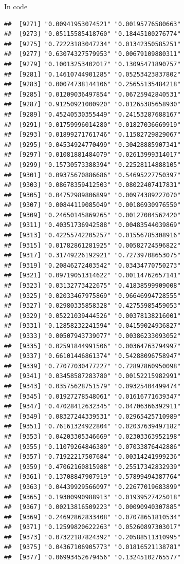 \documentclass[ignorenonframetext,]{beamer}
\begin{document}
\begin{frame}[fragile]{In code}
\begin{verbatim}
##  [9271] "0.00941953074521" "0.00195776580663"
##  [9273] "0.05115585418760" "0.18445100276774"
##  [9275] "0.72223183047234" "0.01342350585251"
##  [9277] "0.63074327579953" "0.00679109880311"
##  [9279] "0.10013253402017" "0.13095471890757"
##  [9281] "0.14610744901285" "0.05253423837802"
##  [9283] "0.00074738144106" "0.25655135484218"
##  [9285] "0.01209036497854" "0.06725942840531"
##  [9287] "0.91250921000920" "0.01265385658930"
##  [9289] "0.45240530355449" "0.24153287688167"
##  [9291] "0.01759996014280" "0.01827036669919"
##  [9293] "0.01899271761746" "0.11582729829067"
##  [9295] "0.04534924770499" "0.30428885907341"
##  [9297] "0.01081881484079" "0.02613999314017"
##  [9299] "0.15730573388394" "0.22528114888105"
##  [9301] "0.09375670886686" "0.54695227750397"
##  [9303] "0.08678359412503" "0.08022407417831"
##  [9305] "0.04752989806899" "0.00974389227070"
##  [9307] "0.00844119085049" "0.00186930976550"
##  [9309] "0.24650145869265" "0.00127004562420"
##  [9311] "0.40351736942588" "0.00483544039869"
##  [9313] "0.42255742205257" "0.01556785308916"
##  [9315] "0.01782861281925" "0.00582724596822"
##  [9317] "0.31749226192921" "0.72739708653075"
##  [9319] "0.20846272403542" "0.03434770750273"
##  [9321] "0.09719051314622" "0.00114762657141"
##  [9323] "0.03132773422675" "0.41838599909008"
##  [9325] "0.02033467975869" "0.96646994728555"
##  [9327] "0.02980335858328" "0.42755985459053"
##  [9329] "0.05221039444526" "0.00378138216001"
##  [9331] "0.12858232241594" "0.04159024936827"
##  [9333] "0.00507943739077" "0.00386233093052"
##  [9335] "0.02591844991506" "0.00364763794997"
##  [9337] "0.66101446861374" "0.54288096758947"
##  [9339] "0.77077030477227" "0.72897860950098"
##  [9341] "0.03458587283780" "0.00152215982991"
##  [9343] "0.03575628751579" "0.09325404499474"
##  [9345] "0.01927278548061" "0.01616771639347"
##  [9347] "0.47028412632345" "0.04706366392911"
##  [9349] "0.08327244339531" "0.02965425710989"
##  [9351] "0.76161324922804" "0.02037639497182"
##  [9353] "0.04203305346669" "0.02303363952198"
##  [9355] "0.11079264846389" "0.07033876442886"
##  [9357] "0.71922217507684" "0.00314241999236"
##  [9359] "0.47062160815988" "0.25517342832939"
##  [9361] "0.13708847907919" "0.57899494387764"
##  [9363] "0.04439929566097" "0.22677019683899"
##  [9365] "0.19300990988913" "0.01939527425018"
##  [9367] "0.00213816509223" "0.00090940307885"
##  [9369] "0.24692862833408" "0.07078651810534"
##  [9371] "0.12599820622263" "0.05260897303017"
##  [9373] "0.07322187824392" "0.20588511310995"
##  [9375] "0.04367106905773" "0.01816521138781"
##  [9377] "0.06993452679456" "0.13245102765577"

\end{verbatim}
\end{frame}
\end{document}
